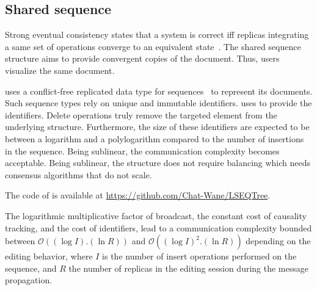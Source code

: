 

\subsection{Shared sequence}

Strong eventual consistency states that a system is correct iff replicas
integrating a same set of operations converge to an equivalent
state~\cite{shapiro2011comprehensive}. The shared sequence structure aims to
provide convergent copies of the document. Thus, users visualize the same
document.

\CRATE uses a conflict-free replicated data type for
sequences~\cite{shapiro2011conflict} to represent its documents. Such sequence
types rely on unique and immutable identifiers. \CRATE uses \LSEQ to provide the
identifiers. Delete operations truly remove the targeted element from the
underlying structure. Furthermore, the size of these identifiers are expected to
be between a logarithm and a polylogarithm compared to the number of insertions
in the sequence. Being sublinear, the communication complexity becomes
acceptable. Being sublinear, the structure does not require balancing which
needs consensus algorithms that do not scale.

The code of \LSEQ is available at \url{https://github.com/Chat-Wane/LSEQTree}.

The logarithmic multiplicative factor of broadcast, the constant cost of
causality tracking, and the cost of identifiers, lead to a communication
complexity bounded between $\mathcal{O}((\log I).(\ln R))$ and
$\mathcal{O}((\log I)^2.(\ln R))$ depending on the editing behavior, where $I$
is the number of insert operations performed on the sequence, and $R$ the number
of replicas in the editing session during the message propagation.

